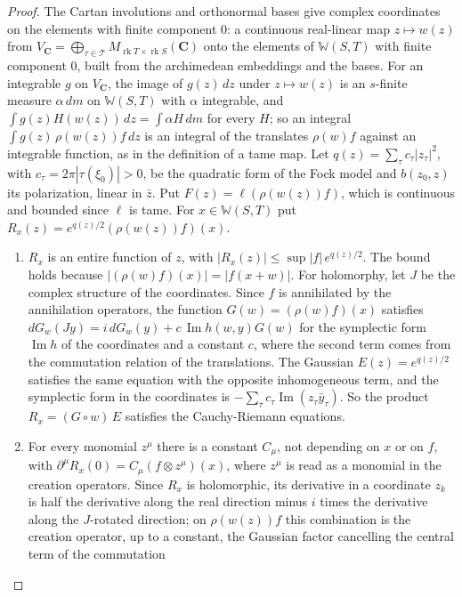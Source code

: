 \begin{proof}
The Cartan involutions and orthonormal bases give complex coordinates on the
elements with finite component $0$: a continuous real-linear map
$z\mapsto w(z)$ from
$V_{\mathbf C}=\bigoplus_{\tau\in\mathcal T}M_{\operatorname{rk}T\times\operatorname{rk}S}(\mathbf C)$
onto the elements of $\mathbb W(S,T)$ with finite component $0$, built from the
archimedean embeddings and the bases. For an integrable $g$ on $V_{\mathbf C}$,
the image of $g(z)\,dz$ under $z\mapsto w(z)$ is an $s$-finite measure
$\alpha\,dm$ on $\mathbb W(S,T)$ with $\alpha$ integrable, and
$\int g(z)H(w(z))\,dz=\int\alpha H\,dm$ for every $H$; so an integral
$\int g(z)\,\rho(w(z))f\,dz$ is an integral of the translates $\rho(w)f$ against
an integrable function, as in the definition of a tame map. Let
$q(z)=\sum_\tau c_\tau|z_\tau|^2$, with
$c_\tau=2\pi|\tau(\xi_0)|>0$, be the quadratic form of the Fock model and
$b(z_0,z)$ its polarization, linear in $\bar z$. Put $F(z)=\ell(\rho(w(z))f)$,
which is continuous and bounded since $\ell$ is tame. For
$x\in\mathbb W(S,T)$ put $R_x(z)=e^{q(z)/2}(\rho(w(z))f)(x)$.
\begin{enumerate}
\item[(a)] $R_x$ is an entire function of $z$, with
  $|R_x(z)|\leq\sup|f|\,e^{q(z)/2}$. The bound holds because
  $|(\rho(w)f)(x)|=|f(x+w)|$. For holomorphy, let $J$ be the complex structure
  of the coordinates. Since $f$ is annihilated by the annihilation operators,
  the function $G(w)=(\rho(w)f)(x)$ satisfies
  $dG_w(Jy)=i\,dG_w(y)+c\,\operatorname{Im}h(w,y)G(w)$ for the symplectic form
  $\operatorname{Im}h$ of the coordinates and a constant $c$, where the second
  term comes from the commutation relation of the translations. The Gaussian
  $E(z)=e^{q(z)/2}$ satisfies the same equation with the opposite inhomogeneous
  term, and the symplectic form in the coordinates is
  $-\sum_\tau c_\tau\operatorname{Im}(z_\tau\bar y_\tau)$. So the product
  $R_x=(G\circ w)\,E$ satisfies the Cauchy-Riemann equations.
\item[(b)] For every monomial $z^\mu$ there is a constant $C_\mu$, not depending
  on $x$ or on $f$, with $\partial^\mu R_x(0)=C_\mu(f\otimes z^\mu)(x)$, where
  $z^\mu$ is read as a monomial in the creation operators. Since $R_x$ is
  holomorphic, its derivative in a coordinate $z_k$ is half the derivative along
  the real direction minus $i$ times the derivative along the $J$-rotated
  direction; on $\rho(w(z))f$ this combination is the creation operator, up to
  a constant, the Gaussian factor cancelling the central term of the commutation

\end{enumerate}
\end{proof}
